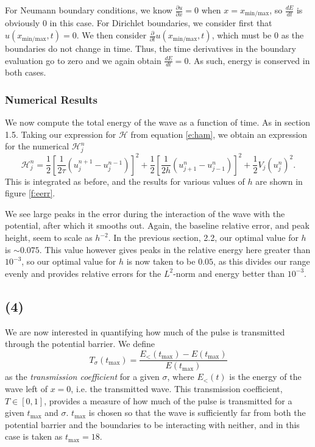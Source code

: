\documentclass[10pt]{article}
\newcommand{\ujn}{u_{j}^{n}}
\newcommand{\ujpn}{u_{j+1}^{n}}
\newcommand{\ujmn}{u_{j-1}^{n}}
\newcommand{\ujnp}{u_{j}^{n+1}}
\newcommand{\ujnm}{u_{j}^{n-1}}
\begin{document}
For Neumann boundary conditions, we know $\frac{\partial u}{\partial x} =0 $ when $x=x_\text{min/max}$,
so $\frac{dE}{dt}$ is obviously $0$ in this case. 
For Dirichlet boundaries, we consider first that $u(x_\text{min/max},t) = 0$. We then consider
$\frac{\partial}{\partial t}u(x_\text{min/max},t)$, which must be $0$ as the boundaries do not change
in time. Thus, the time derivatives in the boundary evaluation go to zero and we again obtain
$\frac{dE}{dt} = 0$. As such, energy is conserved in both cases.

\subsubsection*{Numerical Results}
We now compute the total energy of the wave as a function of time. As in section
1.5.
Taking our expression for $\mathcal{H}$ from equation \ref{e:ham}, we obtain
an expression for the numerical $\mathcal{H}_j^n$
$$ \mathcal{H}_j^n = \frac{1}{2}\left[\frac{1}{2\tau}\left(\ujnp - \ujnm\right)\right]^2
+ \frac{1}{2}\left[ \frac{1}{2h} \left(\ujpn - \ujmn\right)\right]^2 +
\frac{1}{2}V_j\left(\ujn\right)^2.$$
This is integrated as before, and the results for various values of $h$ are shown in
figure \ref{f:eerr}.

We see large peaks in the error during the interaction of the wave with the potential, after which it smooths
out. Again, the baseline relative error, and peak height, seem to scale as $h^{-2}$.
In the previous section, 2.2, our optimal value for $h$ is $\sim 0.075$. This value however gives peaks in the
relative energy here greater than $10^{-3}$, so our optimal value for $h$ is now taken to be $0.05$, as this
divides our range evenly and provides relative errors for the $L^2$-norm and energy better than $10^{-3}$.

\clearpage
\subsection*{(4)}
We are now interested in quantifying how much of the pulse is transmitted through
the potential barrier. We define
\begin{equation}
T_\sigma(t_\text{max}) = \frac{E_<(t_\text{max}) - E(t_\text{max})}{E(t_\text{max})}
\label{e:T}
\end{equation}
as the {\it transmission coefficient} for a given $\sigma$,
where $E_<(t)$ is the energy of the wave left of $x=0$, i.e. the transmitted wave.
This transmission coefficient, $T\in[0,1]$, provides a measure of how much of the pulse
is transmitted for a given $t_\text{max}$ and $\sigma$.
$t_\text{max}$ is chosen so that the wave is sufficiently far from both the potential
barrier and the boundaries to be interacting with neither, and in this case is taken as
$t_\text{max} = 18$.
\end{document}
